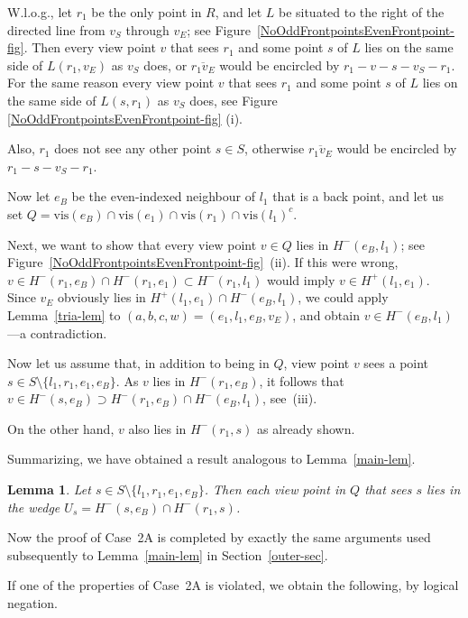 \documentclass[11pt]{article}
\newtheorem{lemma}{Lemma}
\begin{document}
W.l.o.g., let $r_1$ be the only point in $R$, and let $L$ be situated to the right of the directed line from $v_S$ through $v_E$;
see Figure~\ref{NoOddFrontpointsEvenFrontpoint-fig}.
Then every view point $v$ that sees $r_1$ and some point $s$ of $L$ lies on the same side of $L(r_1,v_E)$ as $v_S$ does,
or $ \overline{r_1v_E}$ would be encircled by $r_1-v-s-v_S-r_1$. 
For the same reason every view point $v$ that sees $r_1$ and some point $s$ of $L$ lies on the same side of $L(s,r_1)$ as $v_S$ does,
see Figure \ref{NoOddFrontpointsEvenFrontpoint-fig} (i).

Also, $r_1$ does not see any other point $s\in S$, otherwise $\overline{r_1v_E}$ would be encircled by $r_1-s-v_S-r_1$. 


Now let $e_B$ be the even-indexed neighbour of $l_1$ that is a back point, and let us set 
$Q=\mbox{vis}(e_B)\cap\mbox{vis}(e_1) \cap\mbox{vis}(r_1) \cap \mbox{vis}(l_1)^c$. 

Next, we want to show that every view point $v \in Q$ lies in $H^-(e_B,l_1)$;
see Figure~\ref{NoOddFrontpointsEvenFrontpoint-fig}~(ii). If this were wrong,
$v  \in H^-(r_1,e_B)\cap H^-(r_1,e_1)\subset H^-(r_1,l_1)$ would imply
$v \in H^+(l_1,e_1)$. Since $v_E$ obviously lies in $H^+(l_1,e_1)\cap H^-(e_B,l_1)$,
we could apply Lemma~\ref{tria-lem} to $(a,b,c,w)=(e_1,l_1,e_B,v_E)$, and obtain
$v \in H^-(e_B,l_1)$---a contradiction.

Now let us assume that, in addition to being in $Q$, view point $v$ sees a 
point $s \in S \setminus \{l_1, r_1, e_1, e_B\}$.
As $v$ lies in $H^-(r_1,e_B)$, it follows that $v\in H^-(s,e_B)\supset H^-(r_1,e_B)\cap H^-(e_B,l_1)$, see~(iii). 

On the other hand, $v$ also lies in $H^-(r_1,s)$ as already shown.

Summarizing, we have obtained a result analogous to Lemma~\ref{main-lem}. 

\begin{lemma} \label{case2A-lem}
Let $s \in S \setminus \{l_1, r_1, e_1, e_B\}$. Then each view point in $Q$ that 
sees $s$ lies in the wedge $U_s = H^-(s,e_B) \cap H^-(r_1,s)$.
\end{lemma}

Now the proof of Case~2A is completed by exactly the same arguments used
subsequently to Lemma~\ref{main-lem} in Section~\ref{outer-sec}.  

\bigskip

If one of the properties of Case~2A is violated, we obtain
the following, by logical negation.
\vspace{0.5\baselineskip}
\end{document}
